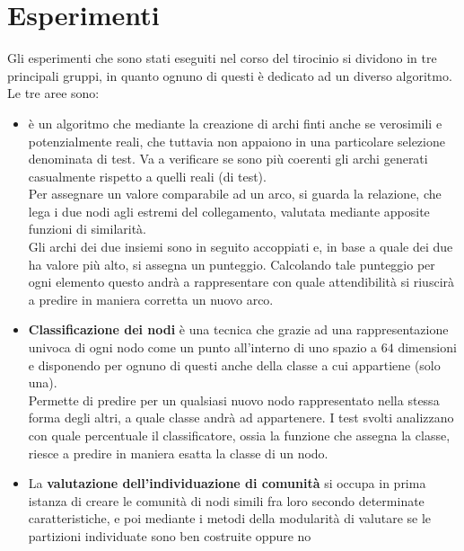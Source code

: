 \section{Esperimenti}
Gli esperimenti che sono stati eseguiti nel corso del tirocinio si dividono in tre principali gruppi, in quanto ognuno di questi è dedicato ad un diverso algoritmo.\\
Le tre aree sono:
\begin{itemize}
	\item \textbf{\LPred} è un algoritmo che mediante la creazione di archi finti anche se verosimili e potenzialmente reali, che tuttavia non appaiono in una particolare selezione denominata di test. Va a verificare se sono più coerenti gli archi generati casualmente rispetto a quelli reali (di test).\\
	Per assegnare un valore comparabile ad un arco, si guarda la relazione, che lega i due nodi agli estremi del collegamento, valutata mediante apposite funzioni di similarità.\\
	Gli archi dei due insiemi sono in seguito accoppiati e, in base a quale dei due ha valore più alto, si assegna un punteggio. Calcolando tale punteggio per ogni elemento questo andrà a rappresentare con quale attendibilità si riuscirà a predire in maniera corretta un nuovo arco.
	\item \textbf{Classificazione dei nodi} è una tecnica che grazie ad una rappresentazione univoca di ogni nodo come un punto all'interno di uno spazio a $64$ dimensioni e disponendo per ognuno di questi anche della classe a cui appartiene (solo una).\\
	Permette di predire per un qualsiasi nuovo nodo rappresentato nella stessa forma degli altri, a quale classe andrà ad appartenere. I test svolti analizzano con quale percentuale il classificatore, ossia la funzione che assegna la classe, riesce a predire in maniera esatta la classe di un nodo.
	\item La \textbf{valutazione dell'individuazione di comunità} si occupa in prima istanza di creare le comunità di nodi simili fra loro secondo determinate caratteristiche, e poi mediante i metodi della modularità di valutare se le partizioni individuate sono ben costruite oppure no
\end{itemize}
%

\newpage
%



